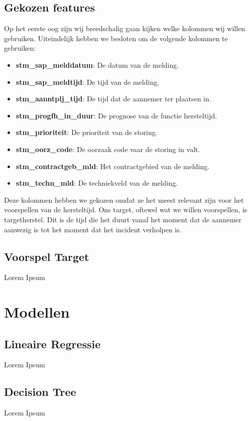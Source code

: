 \documentclass{article}
\begin{document}
\subsection{Gekozen features}
Op het eerste oog zijn wij breedschalig gaan kijken welke kolommen wij willen gebruiken. Uiteindelijk hebben we besloten om de volgende kolommen te gebruiken:
\begin{itemize}
  \item \textbf{stm\_sap\_melddatum}: De datum van de melding.
  \item \textbf{stm\_sap\_meldtijd}: De tijd van de melding.
  \item \textbf{stm\_aanntplj\_tijd}: De tijd dat de aannemer ter plaatsen in. 
  \item \textbf{stm\_progfh\_in\_duur}: De prognose van de functie hersteltijd.
  \item \textbf{stm\_prioriteit}: De prioriteit van de storing.
  \item \textbf{stm\_oorz\_code}: De oorzaak code vaar de storing in valt.
  \item \textbf{stm\_contractgeb\_mld}: Het contractgebied van de melding.
  \item \textbf{stm\_techn\_mld}: De techniekveld van de melding.
\end{itemize}
Deze kolommen hebben we gekozen omdat ze het meest relevant zijn voor het voorspellen van de hersteltijd. Ons target, oftewel wat we willen voorspellen, is targetherstel. Dit is de tijd die het duurt vanaf het moment dat de aannemer aanwezig is tot het moment dat het incident verholpen is.

\subsection{Voorspel Target}
Lorem Ipsum

\newpage
\section{Modellen}

\subsection{Lineaire Regressie}
Lorem Ipsum

\subsection{Decision Tree}
Lorem Ipsum
\end{document}
